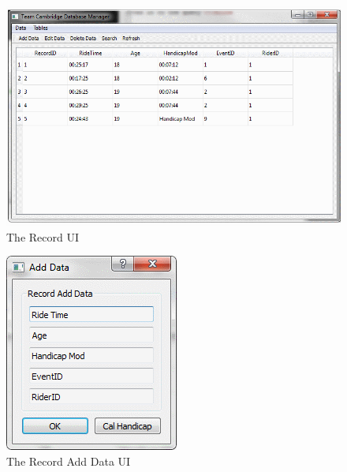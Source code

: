\begin{figure}
\includegraphics[width=\textwidth]{./Maintenance/UI/Record.png}
\caption{The Record UI} \label{fig:Record_UI}
\end{figure}

\begin{figure}
\includegraphics[width=\textwidth]{./Maintenance/UI/RecordAD.png}
\caption{The Record Add Data UI} \label{fig:RecordAD_UI}
\end{figure}


